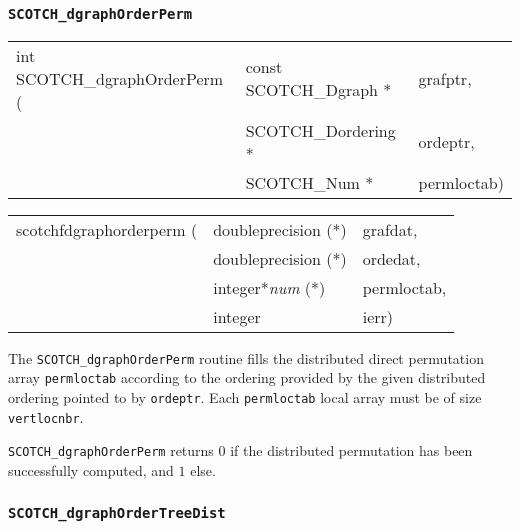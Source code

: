 \subsubsection{{\tt SCOTCH\_dgraphOrderPerm}}

\begin{itemize}
\progsyn

{\tt\begin{tabular}{l@{}ll}
int SCOTCH\_dgraphOrderPerm ( & const SCOTCH\_Dgraph * & grafptr, \\
                              & SCOTCH\_Dordering *    & ordeptr, \\
                              & SCOTCH\_Num *          & permloctab)
\end{tabular}}

{\tt\begin{tabular}{l@{}ll}
scotchfdgraphorderperm ( & doubleprecision (*)   & grafdat,    \\
                         & doubleprecision (*)   & ordedat,    \\
                         & integer*{\it num} (*) & permloctab, \\
                         & integer               & ierr)
\end{tabular}}

\progdes

The {\tt SCOTCH\_dgraphOrderPerm} routine fills the distributed direct
permutation array {\tt permloctab} according to the ordering provided
by the given distributed ordering pointed to by {\tt ordeptr}. Each
{\tt permloctab} local array must be of size {\tt vertlocnbr}.

\progret

{\tt SCOTCH\_dgraphOrderPerm} returns $0$ if the distributed
permutation has been successfully computed, and $1$ else.
\end{itemize}

\subsubsection{{\tt SCOTCH\_dgraphOrderTreeDist}}

